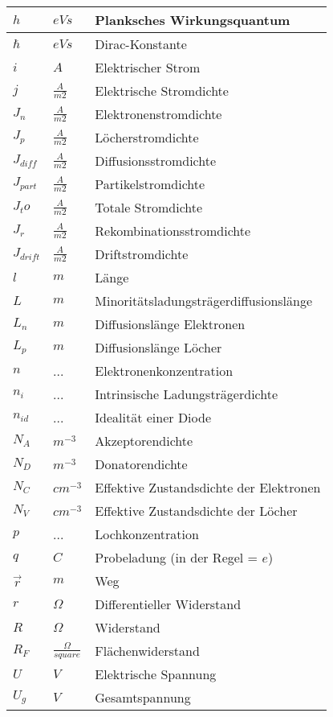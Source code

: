 \documentclass[12pt,a4paper]{report}%
\numberwithin{equation}{section}
\numberwithin{equation}{section}
\begin{document}
\begin{longtable} {|p{2cm}|p{3cm}|p{8.4cm}|}
	$h$ & $eVs$ & Planksches Wirkungsquantum\\ \hline
	$\hbar$ & $eVs$ & Dirac-Konstante \\ \hline
	$i$ & $A$ & Elektrischer Strom \\ \hline
	$j$ & $\frac{A}{m2}$ & Elektrische Stromdichte \\ \hline
	$J_n$ & $\frac{A}{m2}$ & Elektronenstromdichte \\ \hline
	$J_p$ & $\frac{A}{m2}$ & Löcherstromdichte \\ \hline
	$J_{diff}$ & $\frac{A}{m2}$ & Diffusionsstromdichte \\ \hline
	$J_{part}$ & $\frac{A}{m2}$ & Partikelstromdichte \\ \hline
	$J_to$ & $\frac{A}{m2}$ & Totale Stromdichte \\ \hline
	$J_r$ & $\frac{A}{m2}$ & Rekombinationsstromdichte \\ \hline
	$J_{drift}$ & $\frac{A}{m2}$ & Driftstromdichte \\ \hline
	$l$ & $m$ & Länge \\ \hline
	$L$ & $m$ & Minoritätsladungsträgerdiffusionslänge \\ \hline
	$L_n$ & $m$ & Diffusionslänge Elektronen \\ \hline
	$L_p$ & $m$ & Diffusionslänge Löcher \\ \hline
	
	$n$ & ... & Elektronenkonzentration \\ \hline
	$n_i$ & ... & Intrinsische Ladungsträgerdichte \\ \hline
	$n_{id}$ & ... & Idealität einer Diode \\ \hline
  $N_A$ & $m^{-3}$ & Akzeptorendichte \\ \hline
  $N_D$ & $m^{-3}$ & Donatorendichte \\ \hline
	$N_C$ & $cm^{-3}$ & Effektive Zustandsdichte der Elektronen \\ \hline
	$N_V$ & $cm^{-3}$ & Effektive Zustandsdichte der Löcher \\ \hline
	$p$ & ... & Lochkonzentration \\ \hline
	$q$ & $C$ & Probeladung (in der Regel = $e$) \\ \hline
	$\vec{r}$ & $m$ & Weg \\ \hline
	$r$ & $\Omega$ & Differentieller Widerstand \\ \hline
	$R$ & $\Omega$ & Widerstand \\ \hline
	$R_F$ & $\frac{\Omega}{square}$ & Flächenwiderstand \\ \hline 
	$U$ & $V$ & Elektrische Spannung \\ \hline
	$U_g$ & $V$ & Gesamtspannung \\ \hline
	 

\end{longtable}
\end{document}
